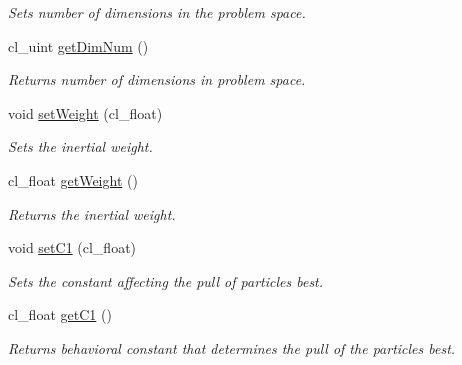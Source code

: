 \begin{DoxyCompactItemize}
\begin{DoxyCompactList}\small\item\em Sets number of dimensions in the problem space. \end{DoxyCompactList}\item 
\mbox{\label{classclSwarm_a04f37f92c926fa1e11d77cb7514da8ec}} 
cl\+\_\+uint \mbox{\hyperlink{classclSwarm_a04f37f92c926fa1e11d77cb7514da8ec}{get\+Dim\+Num}} ()
\begin{DoxyCompactList}\small\item\em Returns number of dimensions in problem space. \end{DoxyCompactList}\item 
\mbox{\label{classclSwarm_a52e20db81e23ae667c8fb20c6201b7c8}} 
void \mbox{\hyperlink{classclSwarm_a52e20db81e23ae667c8fb20c6201b7c8}{set\+Weight}} (cl\+\_\+float)
\begin{DoxyCompactList}\small\item\em Sets the inertial weight. \end{DoxyCompactList}\item 
\mbox{\label{classclSwarm_af5e0c6e4731d96eac29fd9a980cdfa64}} 
cl\+\_\+float \mbox{\hyperlink{classclSwarm_af5e0c6e4731d96eac29fd9a980cdfa64}{get\+Weight}} ()
\begin{DoxyCompactList}\small\item\em Returns the inertial weight. \end{DoxyCompactList}\item 
\mbox{\label{classclSwarm_ad751e4a43d613ca86a07c59938f761fc}} 
void \mbox{\hyperlink{classclSwarm_ad751e4a43d613ca86a07c59938f761fc}{set\+C1}} (cl\+\_\+float)
\begin{DoxyCompactList}\small\item\em Sets the constant affecting the pull of particles\textquotesingle{} best. \end{DoxyCompactList}\item 
\mbox{\label{classclSwarm_a29e4633ea22d85d3ec3969bf26ec2a60}} 
cl\+\_\+float \mbox{\hyperlink{classclSwarm_a29e4633ea22d85d3ec3969bf26ec2a60}{get\+C1}} ()
\begin{DoxyCompactList}\small\item\em Returns behavioral constant that determines the pull of the particle\textquotesingle{}s best. \end{DoxyCompactList}\item 

\end{DoxyCompactItemize}
